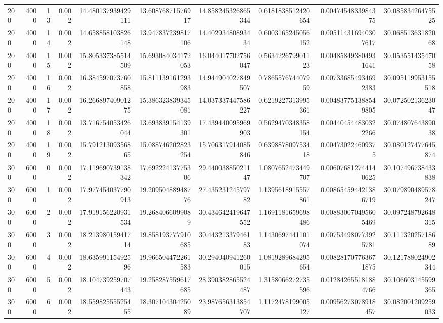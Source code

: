 \begin{tabular}{lrrrrrrrrr}
200 & 4000 & 13 & 0.002 & 14.480137939429111 & 13.60876871576917 & 14.858245326865344 & 0.6181838512420654 & 0.0047454833984375 & 30.08583426475525 \\
200 & 4000 & 14 & 0.002 & 14.658858103826148 & 13.947837239817106 & 14.40293480893434 & 0.6003165245056152 & 0.005114316940307617 & 30.06851363182068 \\
200 & 4000 & 15 & 0.002 & 15.805337385514509 & 15.693084034172053 & 16.044017702756047 & 0.563422679901123 & 0.004858493804931641 & 30.05355143547058 \\
200 & 4000 & 16 & 0.002 & 16.384597073760858 & 15.811139161293983 & 14.944904027849507 & 0.786557674407959 & 0.007336854934692383 & 30.095119953155518 \\
200 & 4000 & 17 & 0.002 & 16.26689740901275 & 15.386323839345081 & 14.037337447586227 & 0.6219227313995361 & 0.004837751388549805 & 30.07250213623047 \\
200 & 4000 & 18 & 0.002 & 13.716754053426044 & 13.693839154139301 & 17.439440095969903 & 0.5629470348358154 & 0.004404544830322266 & 30.07480764389038 \\
200 & 4000 & 19 & 0.002 & 15.79121309356865 & 15.088746202823254 & 15.706317914085846 & 0.639887809753418 & 0.004730224609375 & 30.080127477645874 \\
300 & 6000 & 0 & 0.002 & 17.119690739138342 & 17.69222413775306 & 29.44003885021147 & 1.0807652473449707 & 0.006076812744140625 & 30.107496738433838 \\
300 & 6000 & 1 & 0.002 & 17.977454037790913 & 19.20950488948776 & 27.43523124579782 & 1.1395618915557861 & 0.008654594421386719 & 30.079890489578247 \\
300 & 6000 & 2 & 0.002 & 17.919156220931534 & 19.2684066099089 & 30.434642419647552 & 1.1691181659698486 & 0.008830070495605469 & 30.097248792648315 \\
300 & 6000 & 3 & 0.002 & 18.21398015941714 & 19.858193777910685 & 30.44321337946183 & 1.1430697441101074 & 0.007534980773925781 & 30.11132025718689 \\
300 & 6000 & 4 & 0.002 & 18.63599115492596 & 19.966504472261583 & 30.294040941260015 & 1.0819289684295654 & 0.008281707763671875 & 30.121788024902344 \\
300 & 6000 & 5 & 0.002 & 18.104739259707443 & 19.258287559617685 & 28.390382865524487 & 1.3158066272735596 & 0.012842655181884766 & 30.106603145599365 \\
300 & 6000 & 6 & 0.002 & 18.55982555525455 & 18.30710430425089 & 23.987656313854707 & 1.1172478199005127 & 0.00956273078918457 & 30.082001209259033 \\

\end{tabular}
